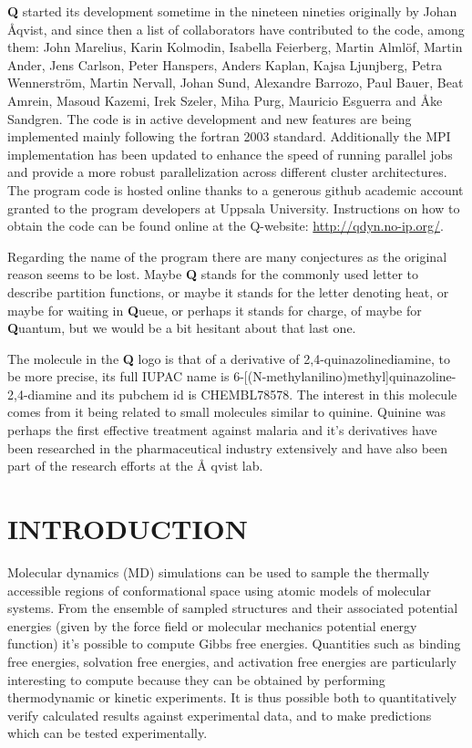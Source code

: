 \documentclass[a4paper,10pt]{article}
\begin{document}
\textbf{Q} started  its development sometime in  the nineteen nineties
originally by Johan \AA qvist, and  since then a list of collaborators
have  contributed  to  the  code, among  them:  John  Marelius,  Karin
Kolmodin,  Isabella Feierberg,  Martin  Alml\"of,  Martin Ander,  Jens
Carlson,  Peter  Hanspers,  Anders   Kaplan,  Kajsa  Ljunjberg,  Petra
Wennerstr\"om,  Martin Nervall,  Johan Sund,  Alexandre Barrozo,  Paul
Bauer, Beat  Amrein, Masoud Kazemi,  Irek Szeler, Miha  Purg, Mauricio
Esguerra and  \AA ke Sandgren. The  code is in active  development and
new features are  being implemented mainly following  the fortran 2003
standard.   Additionally the  MPI implementation  has been  updated to
enhance the speed  of running parallel jobs and provide  a more robust
parallelization across  different cluster architectures.   The program
code is  hosted online  thanks to a  generous github  academic account
granted to the program developers at Uppsala University.  Instructions
on  how to  obtain the  code  can be  found online  at the  Q-website:
\url{http://qdyn.no-ip.org/}.

Regarding the  name of the program  there are many conjectures  as the
original reason seems to be lost.  Maybe \textbf{Q} stands for
the commonly used letter to  describe partition functions, or maybe it
stands  for  the  letter  denoting  heat,  or  maybe  for  waiting  in
\textbf{Q}ueue, or perhaps it stands for charge, of  maybe for 
\textbf{Q}uantum, but we would be a bit hesitant about that last one.

The  molecule in  the  \textbf{Q}  logo is  that  of  a derivative  of
2,4-quinazolinediamine, to  be more  precise, its  full IUPAC  name is
6-[(N-methylanilino)methyl]quinazoline-2,4-diamine and  its pubchem id
is  CHEMBL78578. The  interest in  this molecule  comes from  it being
related to small molecules similar to quinine. Quinine was perhaps the
first effective  treatment against  malaria and it's  derivatives have
been researched  in the  pharmaceutical industry extensively  and have
also been part of the  research efforts\cite{Marelius:1998} at the \AA
qvist lab.


\section{INTRODUCTION}
Molecular  dynamics  (MD)  simulations  can  be  used  to  sample  the
thermally  accessible regions  of  conformational  space using  atomic
models of molecular systems.  From  the ensemble of sampled structures
and their associated  potential energies (given by the  force field or
molecular  mechanics  potential  energy  function)  it's  possible  to
compute  Gibbs  free  energies.    Quantities  such  as  binding  free
energies, solvation  free energies,  and activation free  energies are
particularly interesting  to compute because  they can be  obtained by
performing thermodynamic or kinetic  experiments.  It is thus possible
both to quantitatively verify  calculated results against experimental
data, and to make predictions which can be tested experimentally.
\end{document}
